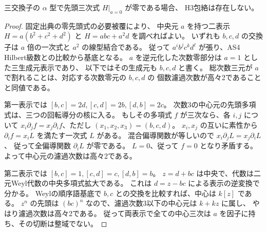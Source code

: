 \begin{proposition}\label{prop:cubic-CY-three-alpha-zero-empty}
三交換子の $\alpha$ 型で先頭三次式 $H|_{a=0}$ が零である場合、
H3包絡は存在しない。
\end{proposition}
\begin{proof}
固定出典\cite{AS4CYpinned}の零先頭式の必要被覆により、
中央元 $a$ を持つ二表示
$H=a(b^2+c^2+d^2)$ と $H=abc+a^2d$ を調べればよい。
いずれも $b,c,d$ の交換子は $a$ 倍の一次式と $a^2$ の線型結合である。
従って $a^i b^j c^k d^\ell$ が張り、AS4 Hilbert級数との比較から基底となる。
$a$ を逆元化した次数零部分は $a=1$ とした三生成元表示であり、
以下ではその生成元も $b,c,d$ と書く。
総次数三元が $a$ で割れることは、対応する次数零元の $b,c,d$ の
個数濾過次数が高々2であることと同値である。

第一表示では $[b,c]=2d,[c,d]=2b,[d,b]=2c$。
次数3の中心元の先頭多項式は、三つの回転導分の核に入る。
もしその多項式 $f$ が三次なら、各 $i,j$ について
$x_i\partial_jf=x_j\partial_if$、ただし $(x_1,x_2,x_3)=(b,c,d)$。
$x_i,x_j$ の互いに素性から $\partial_i f=x_i L$ を満たす一次式 $L$ がある。
混合偏導関数が等しいので $x_i\partial_j L=x_j\partial_i L$、
従って全偏導関数 $\partial_i L$ が零である。
$L=0$、従って $f=0$ となり矛盾する。
よって中心元の濾過次数は高々2である。

第二表示では $[b,c]=1,[c,d]=c,[d,b]=b$。
$z=d+bc$ は中央で、代数は二元Weyl代数の中央多項式拡大である。
これは $d=z-bc$ による表示の逆変換で分かる。
Weylの順序語基底で $b,c$ との交換を比較すれば、中心は $k[z]$ である。
$z^n$ の先頭は $(bc)^n$ なので、濾過次数3以下の中心元は $k+kz$ に属し、
やはり濾過次数は高々2である。
従って両表示で全ての中心三次は $a$ を因子に持ち、その切断は整域でない。
\end{proof}
